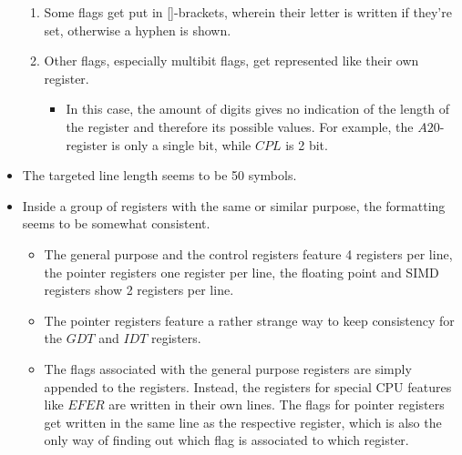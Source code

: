 \begin{itemize}
\begin{enumerate}
    \item Some flags get put in []-brackets,
    wherein their letter is written if they're set, otherwise a hyphen is shown.
    \item Other flags, especially multibit flags, get represented like their own register.
    \begin{itemize}
      \item In this case, the amount of digits gives no indication of the length of the register and therefore its possible values.
      For example, the $A20$-register is only a single bit, while $CPL$ is 2 bit.
    \end{itemize}
  \end{enumerate}
  \item The targeted line length seems to be 50 symbols.
  \item Inside a group of registers with the same or similar purpose, the formatting seems to be somewhat consistent.
  \begin{itemize}
    \item The general purpose and the control registers feature 4 registers per line,
    the pointer registers one register per line, the floating point and SIMD registers show 2 registers per line.
    \item The pointer registers feature a rather strange way to keep consistency for the $GDT$ and $IDT$ registers.
    \item The flags associated with the general purpose registers are simply appended to the registers.
    Instead, the registers for special CPU features like $EFER$ are written in their own lines.
    The flags for pointer registers get written in the same line as the respective register,
    which is also the only way of finding out which flag is associated to which register.
  \end{itemize}
\end{itemize}